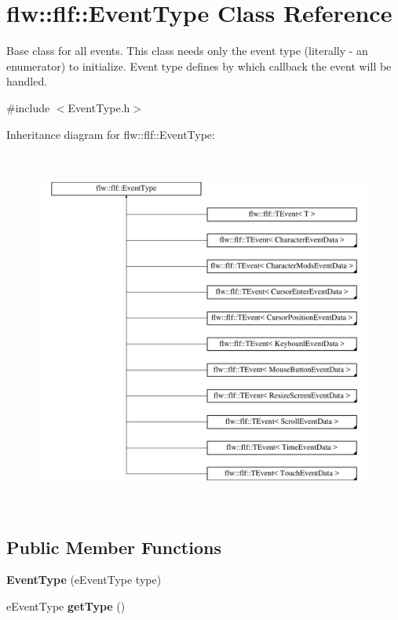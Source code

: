 \hypertarget{classflw_1_1flf_1_1EventType}{}\section{flw\+:\+:flf\+:\+:Event\+Type Class Reference}
\label{classflw_1_1flf_1_1EventType}


Base class for all events. This class needs only the event type (literally -\/ an enumerator) to initialize. Event type defines by which callback the event will be handled.  




{\ttfamily \#include $<$Event\+Type.\+h$>$}

Inheritance diagram for flw\+:\+:flf\+:\+:Event\+Type\+:\begin{figure}[H]
\begin{center}
\leavevmode
\includegraphics[height=12.000000cm]{classflw_1_1flf_1_1EventType}
\end{center}
\end{figure}
\subsection*{Public Member Functions}
\begin{DoxyCompactItemize}
\item 
{\bfseries Event\+Type} (e\+Event\+Type type)\hypertarget{classflw_1_1flf_1_1EventType_a9965ef6f0b75517dda7f87e00beae5d0}{}\label{classflw_1_1flf_1_1EventType_a9965ef6f0b75517dda7f87e00beae5d0}

\item 
e\+Event\+Type {\bfseries get\+Type} ()\hypertarget{classflw_1_1flf_1_1EventType_a5ac577de1d726b1f47b5c08a9f597438}{}\label{classflw_1_1flf_1_1EventType_a5ac577de1d726b1f47b5c08a9f597438}

\end{DoxyCompactItemize}


